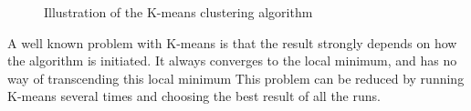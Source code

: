 \begin{figure}[t!]
	\centering
		\qquad
		\qquad


		\qquad
		\qquad	
		\caption{Illustration of the K-means clustering algorithm}%
		\label{fig:kmeans}%
\end{figure}


A well known problem with K-means is that the result strongly depends on how the algorithm is initiated. It always converges to the local minimum, and has no way of transcending this local minimum
This problem can be reduced by running K-means several times and choosing the best result of all the runs. 


